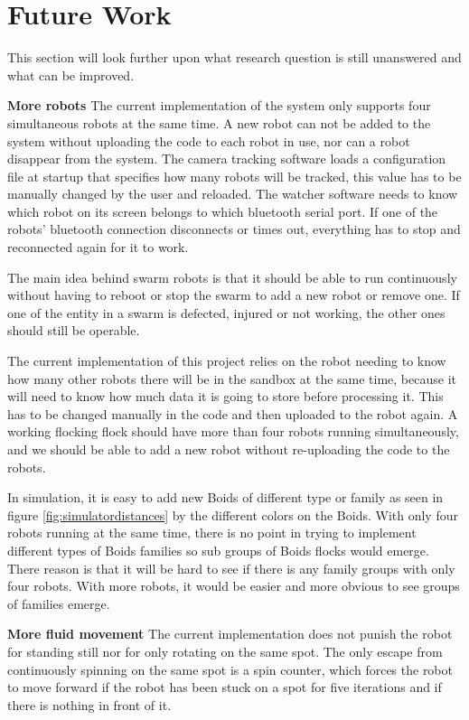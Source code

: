 \section{Future Work}
\label{sec:futureWork}

This section will look further upon what research question is still unanswered and what can be improved.

\textbf{More robots}
The current implementation of the system only supports four simultaneous robots at the same time. A new robot can not be added to the system without uploading the code to each robot in use, nor can a robot disappear from the system. The camera tracking software loads a configuration file at startup that specifies how many robots will be tracked, this value has to be manually changed by the user and reloaded.
The watcher software needs to know which robot on its screen belongs to which bluetooth serial port. If one of the robots' bluetooth connection disconnects or times out, everything has to stop and reconnected again for it to work.

The main idea behind swarm robots is that it should be able to run continuously without having to reboot or stop the swarm to add a new robot or remove one. If one of the entity in a swarm is defected, injured or not working, the other ones should still be operable.

The current implementation of this project relies on the robot needing to know how many other robots there will be in the sandbox at the same time, because it will need to know how much data it is going to store before processing it. This has to be changed manually in the code and then uploaded to the robot again.
A working flocking flock should have more than four robots running simultaneously, and we should be able to add a new robot without re-uploading the code to the robots.

In simulation, it is easy to add new Boids of different type or family as seen in figure \ref{fig:simulatordistances} by the different colors on the Boids. With only four robots running at the same time, there is no point in trying to implement different types of Boids families so sub groups of Boids flocks would emerge. There reason is that it will be hard to see if there is any family groups with only four robots. With more robots, it would be easier and more obvious to see groups of families emerge. 

\textbf{More fluid movement} %
The current implementation does not punish the robot for standing still nor for only rotating on the same spot. The only escape from continuously spinning on the same spot is a spin counter, which forces the robot to move forward if the robot has been stuck on a spot for five iterations and if there is nothing in front of it. 

